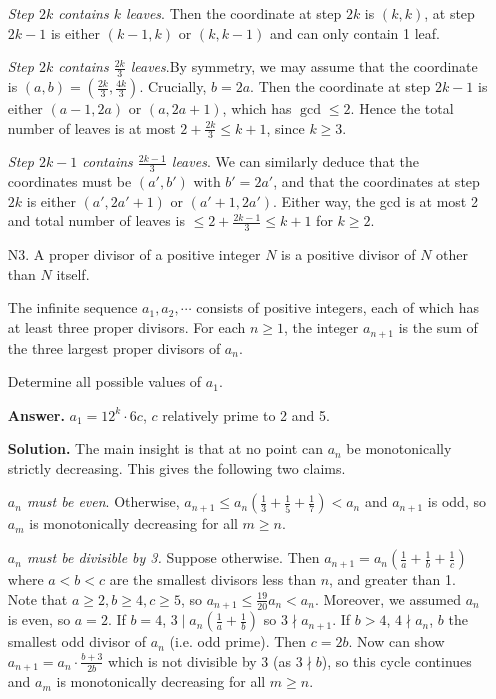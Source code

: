 \documentclass[11pt,a4paper]{article}
\begin{document}
\begin{enumerate}
    	\textit{Step $2k$ contains $k$ leaves}. Then the coordinate at step $2k$ is $(k, k)$, 
    	at step $2k-1$ is either $(k-1, k)$ or $(k, k-1)$ and can only contain 1 leaf. 
    	
    	\textit{Step $2k$ contains $\frac{2k}{3}$ leaves}.By symmetry, we may assume that the coordinate is $(a, b)=(\frac{2k}{3}, \frac{4k}{3})$. 
    	Crucially, $b=2a$. Then the coordinate at step $2k-1$ is either $(a-1, 2a)$ or $(a, 2a+1)$, 
    	which has $\gcd\le 2$. 
    	Hence the total number of leaves is at most $2 + \frac{2k}{3}\le k + 1$, since $k\ge 3$. 
    	
    	\textit{Step $2k - 1$ contains $\frac{2k - 1}{3}$ leaves}. We can similarly deduce that the coordinates must be 
    	$(a', b')$ with $b'=2a'$, 
    	and that the coordinates at step $2k$ is either $(a', 2a'+1)$ or $(a'+1, 2a')$. 
        Either way, the gcd is at most 2 and total number of leaves is $\le 2 + \frac{2k-1}{3}\le k + 1$ for $k\ge 2$. 
    	
    	\item [N3.] A proper divisor of a positive integer $N$ is a positive divisor of $N$ other than $N$ itself.
    	
    	The infinite sequence $a_1, a_2, \cdots$ consists of positive integers, each of which has at least three proper divisors. For each $n\geq 1$, the integer $a_{n+1}$ is the sum of the three largest proper divisors of $a_n$.
    	
    	Determine all possible values of $a_1$.
    	
    	\textbf{Answer.} $a_1 = 12^{k}\cdot 6c$, $c$ relatively prime to 2 and 5. 
    	
    	\textbf{Solution.} The main insight is that at no point can $a_n$ be monotonically strictly decreasing. 
    	This gives the following two claims. 
    	
    	\textit{$a_n$ must be even}. Otherwise, $a_{n+1}\le a_n(\frac{1}{3}+\frac{1}{5}+\frac{1}{7}) < a_n$ and $a_{n+1}$ is odd, so $a_m$ is monotonically decreasing for all $m\ge n$. 
    	
    	\textit{$a_{n}$ must be divisible by 3.} Suppose otherwise. 
    	Then $a_{n+1}=a_n(\frac{1}{a}+\frac{1}{b}+\frac{1}{c})$ where $a<b<c$ are the smallest divisors less than $n$, 
    	and greater than 1. 
    	Note that $a\ge 2, b\ge 4, c\ge 5$, so $a_{n+1}\le \frac{19}{20}a_n < a_n$. 
    	Moreover, we assumed $a_n$ is even, so $a=2$. 
    	If $b = 4$, $3\mid a_n(\frac{1}{a}+\frac{1}{b})$ so $3\nmid a_{n+1}$. 
    	If $b > 4$, $4\nmid a_n$, $b$ the smallest odd divisor of $a_n$ (i.e. odd prime). 
    	Then $c = 2b$. Now can show $a_{n+1}=a_n\cdot \frac{b+3}{2b}$ which is not divisible by 3 (as $3\nmid b$), so this cycle continues and $a_m$ is monotonically decreasing for all $m\ge n$. 
    	

\end{enumerate}
\end{document}
